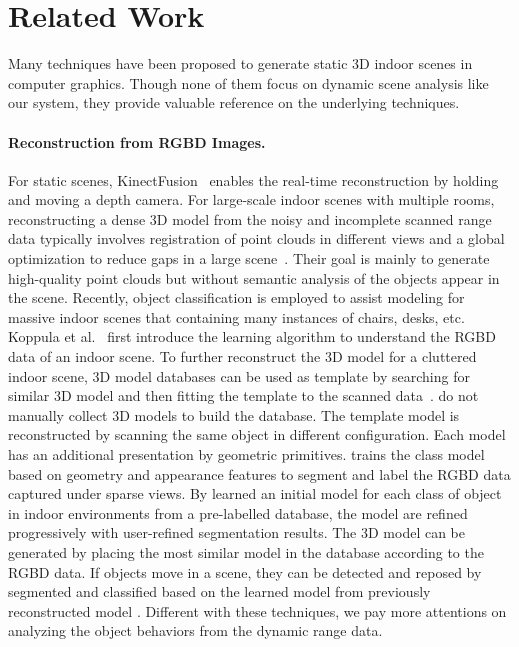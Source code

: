 

\section{Related Work}


Many techniques have been proposed to generate static 3D indoor scenes in computer graphics.
Though none of them focus on dynamic scene analysis like our system, they provide valuable reference on the underlying techniques.

\paragraph{Reconstruction from RGBD Images.}
%
For static scenes, KinectFusion~\cite{kinectfusion11} enables the real-time reconstruction by holding and moving a depth camera.
%
For large-scale indoor scenes with multiple rooms, reconstructing a dense 3D model from the noisy and incomplete scanned range data typically involves registration of point clouds in different views and a global optimization to reduce gaps in a large scene~\cite{MuseumCSG12,Hen12RGB}.
Their goal is mainly to generate high-quality point clouds but without semantic analysis of the objects appear in the scene.
Recently, object classification is employed to assist modeling for massive indoor scenes that containing many instances of chairs, desks, etc.
Koppula et al.~ first introduce the learning algorithm to understand the RGBD data of an indoor scene.
To further reconstruct the 3{D} model for a cluttered indoor scene, 3{D} model databases can be used as template by searching for similar 3D model and then fitting the template to the scanned data~\cite{shao12,NanIndoor2012}.
\cite{kmyg_acquireIndoor_sigga12} do not manually collect 3{D} models to build the database.
The template model is reconstructed by scanning the same object in different configuration.
Each model has an additional presentation by geometric primitives.
\cite{shao12} trains the class model based on geometry and appearance features to segment and label the RGBD data captured under sparse views.
By learned an initial model for each class of object in indoor environments from a pre-labelled database, the model are refined progressively with user-refined segmentation results.
The 3{D} model can be generated by placing the most similar model in the database according to the RGBD data.
If objects move in a scene, they can be detected and reposed by segmented and classified based on the learned model from previously reconstructed model \cite{IndoorUpdatingPG14}.
Different with these techniques, we pay more attentions on analyzing the object behaviors from the dynamic range data.

